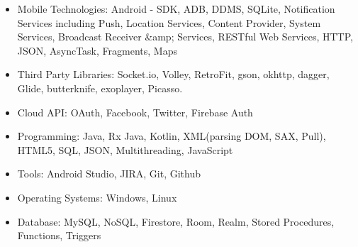 \setlength{\columnsep}{0.5cm}

\begin{cvparagraph}
    \begin{minipage}{0.50\textwidth}
        \begin{itemize}
            \item {Mobile Technologies: Android - SDK, ADB, DDMS, SQLite, Notification Services including Push, Location Services, Content Provider, System Services, Broadcast Receiver &amp; Services, RESTful Web Services, HTTP, JSON, AsyncTask, Fragments, Maps}
            \item {Third Party Libraries: Socket.io, Volley, RetroFit, gson, okhttp, dagger, Glide, butterknife, exoplayer, Picasso.}
        \end{itemize}
    \end{minipage}%
    \hfill
    \begin{minipage}{0.50\textwidth}
        \begin{itemize}
            \item {Cloud API: OAuth, Facebook, Twitter, Firebase Auth}
            \item {Programming: Java, Rx Java, Kotlin, XML(parsing DOM, SAX, Pull), HTML5, SQL, JSON, Multithreading, JavaScript}
            \item {Tools: Android Studio, JIRA, Git, Github}
            \item {Operating Systems: Windows, Linux}
            \item {Database: MySQL, NoSQL, Firestore, Room, Realm, Stored Procedures, Functions, Triggers}
        \end{itemize}
    \end{minipage}%
\end{cvparagraph}
